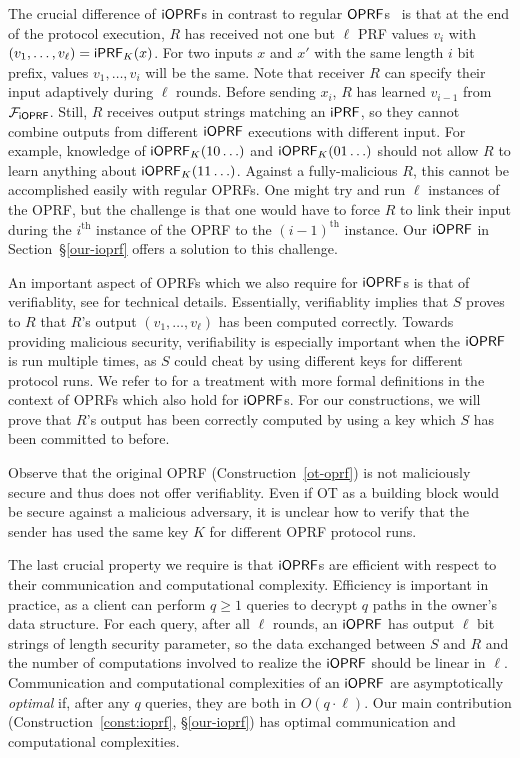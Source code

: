The crucial difference of $\mathsf{i}\mathsf{OPRF}$s in contrast to regular
$\mathsf{OPRF}$s~\cite{oprf,stan,chase,koles,boneh,kia} is that at the end of
the protocol execution, $R$ has received not one but $\ell$ PRF values
$v_i$ with $(v_1,\ldots,v_\ell)=\mathsf{i}\mathsf{PRF}_K(x)$. For two inputs $x$ and $x'$
with the same length $i$ bit prefix, values $v_1,\ldots,v_i$ will be
the same. Note that receiver $R$ can specify their input adaptively
during $\ell$ rounds. Before sending $x_i$, $R$ has learned $v_{i-1}$
from $\mathcal{F}_{\mathsf{i}\mathsf{OPRF}}$. Still, $R$ receives output strings matching an
$\mathsf{i}\mathsf{PRF}$, so they cannot combine outputs from different $\mathsf{i}\mathsf{OPRF}$
executions with different input. For example, knowledge of
$\mathsf{i}\mathsf{OPRF}_K(10\ldots)$ and $\mathsf{i}\mathsf{OPRF}_K(01\ldots)$ should not allow $R$ to
learn anything about $\mathsf{i}\mathsf{OPRF}_K(11\ldots)$.  Against a fully-malicious
$R$, this cannot be accomplished easily with regular OPRFs.  One
might try and run $\ell$ instances of the OPRF, but the challenge is
that one would have to force $R$ to link their input during the
$i^\text{th}$ instance of the OPRF to the $(i-1)^\text{th}$ instance.
Our $\mathsf{i}\mathsf{OPRF}$ in Section~\S\ref{our-ioprf} offers a solution to this
challenge.

An important aspect of OPRFs which we also require for $\mathsf{i}\mathsf{OPRF}$s is
that of {verifiablity}, see \citet{kia} for technical
details. Essentially, verifiablity implies that $S$ proves to $R$ that
$R$'s output $(v_1,\ldots,v_\ell)$ has been computed correctly. Towards
providing malicious security, verifiability is especially important
when the $\mathsf{i}\mathsf{OPRF}$ is run multiple times, as $S$ could cheat by using
different keys for different protocol runs.
We refer to \cite{kia} for a treatment with more formal definitions in
the context of OPRFs which also hold for $\mathsf{i}\mathsf{OPRF}$s.  For our
constructions, we will prove that $R$'s output has been
correctly computed by using a key which $S$ has been committed to
before.

Observe that the original \citet{oprf} OPRF
(Construction~\ref{ot-oprf}) is not maliciously secure and thus does
not offer verifiablity. Even if OT as a building block would be secure
against a malicious adversary, it is unclear how to verify that the
sender has used the same key $K$ for different OPRF protocol runs.

The last crucial property we require is that $\mathsf{i}\mathsf{OPRF}$s are efficient
with respect to their communication and computational complexity.
Efficiency is important in practice, as a client can perform
$q\geq{}1$ queries to decrypt $q$ paths in the owner's data structure.
For each query, after all $\ell$ rounds, an $\mathsf{i}\mathsf{OPRF}$ has output $\ell$
bit strings of length security parameter, so the data exchanged
between $S$ and $R$ and the number of computations involved to realize
the $\mathsf{i}\mathsf{OPRF}$ should be linear in $\ell$.
Communication and computational complexities of an $\mathsf{i}\mathsf{OPRF}$ are
asymptotically \emph{optimal} if, after any $q$ queries, they are both
in $O(q\cdot\ell)$.  Our main contribution
(Construction~\ref{const:ioprf}, \S\ref{our-ioprf}) has optimal
communication and computational complexities.

